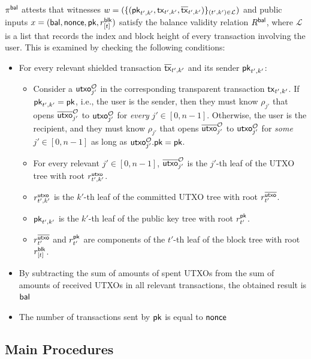 \begin{enumerate}
    $\pi^\mathsf{bal}$ attests that witnesses $w = (\{({\mathsf{pk}}_{t', k'}, \mathsf{tx}_{t', k'}, \overline{\mathsf{tx}}_{t', k'})\}_{(t', k') \in \mathcal{L}})$ and public inputs $x = (\mathsf{bal}, \mathsf{nonce}, {\mathsf{pk}}, r^\mathsf{blk}_{[t]})$ satisfy the balance validity relation $R^\mathsf{bal}$, where $\mathcal{L}$ is a list that records the index and block height of every transaction involving the user.
    This is examined by checking the following conditions:
    \begin{itemize}
        \item For every relevant shielded transaction $\overline{\mathsf{tx}}_{t', k'}$ and its sender ${\mathsf{pk}}_{t', k'}$:
        \begin{itemize}
            \item Consider a $\mathsf{utxo}^\mathcal{O}_{j'}$ in the corresponding transparent transaction $\mathsf{tx}_{t', k'}$.
            If ${\mathsf{pk}}_{t', k'} = {\mathsf{pk}}$, i.e., the user is the sender, then they must know $\rho_{j'}$ that opens $\overline{\mathsf{utxo}}^\mathcal{O}_{j'}$ to $\mathsf{utxo}^\mathcal{O}_{j'}$ for \textit{every} $j' \in [0, n - 1]$.
            Otherwise, the user is the recipient, and they must know $\rho_{j'}$ that opens $\overline{\mathsf{utxo}}^\mathcal{O}_{j'}$ to $\mathsf{utxo}^\mathcal{O}_{j'}$ for \textit{some} $j' \in [0, n - 1]$ as long as $\mathsf{utxo}^\mathcal{O}_{j'}.{\mathsf{pk}} = {\mathsf{pk}}$.

            \item For every relevant $j' \in [0, n - 1]$, $\overline{\mathsf{utxo}}^\mathcal{O}_{j'}$ is the $j'$-th leaf of the \ac{UTXO} tree with root $r^\mathsf{utxo}_{t', k'}$.
            \item $r^\mathsf{utxo}_{t', k'}$ is the $k'$-th leaf of the committed \ac{UTXO} tree with root $r^{\overline{\mathsf{utxo}}}_{t'}$.
            \item ${\mathsf{pk}}_{t', k'}$ is the $k'$-th leaf of the public key tree with root $r^{\mathsf{pk}}_{t'}$.
            \item $r^{\overline{\mathsf{utxo}}}_{t'}$ and $r^{\mathsf{pk}}_{t'}$ are components of the $t'$-th leaf of the block tree with root $r^\mathsf{blk}_{[t]}$.
        \end{itemize}
        \item By subtracting the sum of amounts of spent \acp{UTXO} from the sum of amounts of received \acp{UTXO} in all relevant transactions, the obtained result is $\mathsf{bal}$
        \item The number of transactions sent by ${\mathsf{pk}}$ is equal to $\mathsf{nonce}$
    \end{itemize}
\end{enumerate}

\subsection{Main Procedures}

